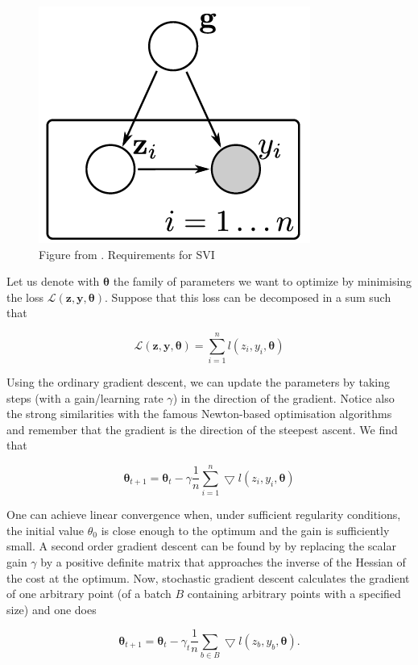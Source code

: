 \documentclass[12pt,a4paper,oneside]{book}
\begin{document}
{\begin{figure}[!htb]
     \centering
     \includegraphics[width=0.4\linewidth]{plot_variational_inference}
     \caption{Figure from \cite{hensman2013}. Requirements for SVI}\label{fig:var_app_1.1}
\end{figure}

Let us denote with $\bm{\theta}$ the family of parameters we want to optimize by minimising the loss $\mathcal{L}(\bm{z},\bm{y},\bm{\theta})$. Suppose that this loss can be decomposed in a sum such that 

\begin{equation}
\mathcal{L}(\bm{z},\bm{y},\bm{\theta}) = \sum\limits_{i=1}^n l (z_i,y_i,\bm{\theta})
\end{equation}

Using the ordinary gradient descent, we can update the parameters by taking steps (with a gain/learning rate $\gamma$) in the direction of the gradient. Notice also the strong similarities with the famous Newton-based optimisation algorithms and remember that the gradient is the direction of the steepest ascent. We find that 

\begin{equation}\label{gradient_descent}
\bm{\theta}_{t+1} = \bm{\theta}_{t} -  \gamma \dfrac{1}{n} \sum\limits_{i=1}^n \bigtriangledown l(z_i,y_i,\bm{\theta})
\end{equation}

One can achieve linear convergence when, under sufficient regularity conditions, the initial value $\theta_0$ is close enough to the optimum and the gain is sufficiently small. A second order gradient descent can be found by by replacing the scalar gain $\gamma$ by a positive definite matrix that approaches the inverse of the Hessian of the cost at the optimum. Now, stochastic gradient descent calculates the gradient of one arbitrary point (of a batch $B$ containing arbitrary points with a specified size) and one does


\begin{equation}\label{stoch_gradient_descent}
\bm{\theta}_{t+1} = \bm{\theta}_{t} -  \gamma_t \dfrac{1}{n} \sum\limits_{b \in B } \bigtriangledown l(z_b,y_b,\bm{\theta}).
\end{equation}

}
\end{document}
